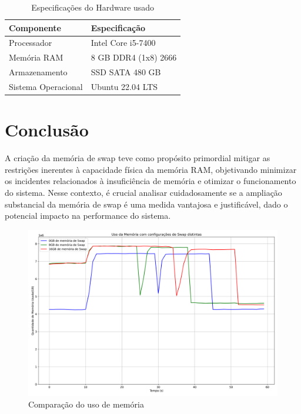 \documentclass[
	12pt,				%
	openright,			%
	oneside,			%
	a4paper,			%
	chapter=TITLE,		%
	english,			%
	french,				%
	spanish,			%
	brazil				%
	]{abntex2}
\theoremstyle{definition}
\begin{document}
\begin{table}[H]
    \centering
    \caption{Especificações do Hardware usado}
    \begin{tabular}{@{}ll@{}}
        \toprule
        \textbf{Componente} & \textbf{Especificação} \\
        \midrule
        Processador & Intel Core i5-7400 \\
        Memória RAM & 8 GB DDR4 (1x8) 2666 \\
        Armazenamento & SSD SATA 480 GB \\
        Sistema Operacional & Ubuntu 22.04 LTS \\
        \bottomrule
    \end{tabular}
    \label{tab:ideapad_specs}
\end{table}


\chapter{Conclusão}
\label{conclusao}

A criação da memória de swap teve como propósito primordial mitigar as restrições inerentes à capacidade física da memória RAM, objetivando minimizar os 
incidentes relacionados à insuficiência de memória e otimizar o funcionamento do sistema. Nesse contexto, é crucial analisar cuidadosamente
se a ampliação substancial da memória de swap é uma medida vantajosa e justificável, dado o potencial impacto na performance do sistema.

\begin{figure}[H]
	\centering
	\includegraphics[width=1.0\textwidth]{comparar.png}
	\caption{Comparação do uso de memória}
	\label{fig:comparacao_memoria}
\end{figure}
\end{document}
